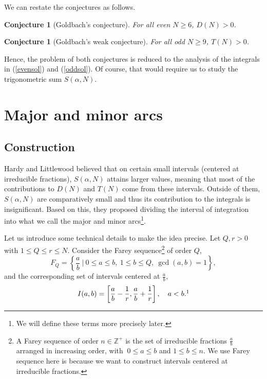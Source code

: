 \documentclass{article}
\newtheorem{conjecture}[theorem]{Conjecture}
\begin{document}
We can restate the conjectures as follows.
\begin{conjecture}[Goldbach's conjecture]
     For all even $N \geq 6$, $D(N) > 0$.
\end{conjecture}
\begin{conjecture}[Goldbach's weak conjecture]
     For all odd $N \geq 9$, $T(N) > 0$.
\end{conjecture}
Hence, the problem of both conjectures is reduced to the analysis of the integrals in (\ref{evensol}) and (\ref{oddsol}). Of course, that would require us to study the trigonometric sum $S(\alpha, N)$.
\section{Major and minor arcs}
\subsection{Construction}
Hardy and Littlewood believed that on certain small intervals (centered at irreducible fractions\footnotemark[2]{}), $S(\alpha, N)$ attains larger values, meaning that most of the contributions to $D(N)$ and $T(N)$ come from these intervals. Outside of them, $S(\alpha, N)$ are comparatively small and thus its contribution to the integrals is insignificant. Based on this, they proposed dividing the interval of integration into what we call the major and minor arcs\footnote{We will define these terms more precisely later.}. 

Let us introduce some technical details to make the idea precise. Let $Q, r > 0$ with $1 \leq Q \leq r \leq N$. Consider the Farey sequence\footnote{A Farey sequence of order $n\in \mathbb{Z}^+$ is the set of irreducible fractions $\frac{a}{b}$ arranged in increasing order, with $\ 0 \leq a \leq b$ and $1 \leq b \leq n$. We use Farey sequence here is because we want to construct intervals centered at irreducible fractions.} of order $Q$,
\begin{equation*}\label{farey}
    F_Q = \left\{\frac{a}{b}\ \Big | \ 0 \leq a \leq b,\ 1 \leq b \leq Q,\ \gcd(a,b) = 1\right\},
\end{equation*}
and the corresponding set of intervals centered at $\displaystyle\frac{a}{b}$,
\begin{equation*}
    I(a,b) = \left[\frac{a}{b} - \frac{1}{r}, \frac{a}{b} + \frac{1}{r}\right], \quad a < b.\footnotemark{}
\end{equation*}
\end{document}
